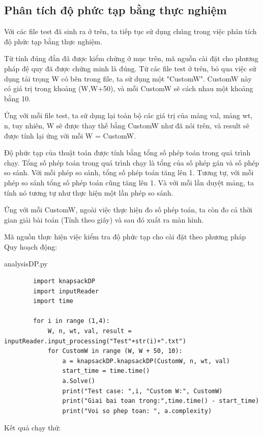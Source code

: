 \documentclass[12pt,a4paper]{report}
\begin{document}
    \subsection{Phân tích độ phức tạp bằng thực nghiệm}
    Với các file test đã sinh ra ở trên, ta tiếp tục sử dụng chúng trong việc phân
    tích độ phức tạp bằng thực nghiệm.

    Từ tính đúng đắn đã được kiểm chứng ở mục trên, mã nguồn cài đặt cho phương 
    pháp đệ quy đã được chứng minh là đúng. Từ các file test ở trên, bỏ qua việc sử 
    dụng tải trọng W có bên trong file, ta sử dụng một "CustomW". CustomW này 
    có giá trị trong khoảng (W,W+50), và mỗi CustomW sẽ cách nhau một khoảng bằng 10. 

    Ứng với mỗi file test, ta sử dụng lại toàn bộ các giá trị của mảng val, mảng wt,
    n, tuy nhiên, W sẽ được thay thế bằng CustomW như đã nói trên, và result sẽ được
    tính lại ứng với mỗi W = CustomW.

    Độ phức tạp của thuật toán được tính bằng tổng số phép toán trong quá trình chạy.
    Tổng số phép toán trong quá trình chạy là tổng của số phép gán và số phép so sánh.
    Với mỗi phép so sánh, tổng số phép toán tăng lên 1. Tương tự, với mỗi phép so sánh
    tổng số phép toán cũng tăng lên 1. Và với mỗi lần duyệt mảng, ta tính nó tương tự 
    như thực hiện một lần phép so sánh.

    Ứng với mỗi CustomW, ngoài việc thực hiện đo số phép toán, ta còn đo cả thời gian 
    giải bài toán (Tính theo giây) và sau đó xuất ra màn hình.

    Mã nguồn thực hiện việc kiểm tra độ phức tạp cho cài đặt theo phương pháp
    Quy hoạch động: 

    analysisDP.py

    \begin{lstlisting}
        import knapsackDP
        import inputReader
        import time

        for i in range (1,4):
            W, n, wt, val, result = inputReader.input_processing("Test"+str(i)+".txt")
            for CustomW in range (W, W + 50, 10):
                a = knapsackDP.knapsackDP(CustomW, n, wt, val)
                start_time = time.time()
                a.Solve()
                print("Test case: ",i, "Custom W:", CustomW)
                print("Giai bai toan trong:",time.time() - start_time)
                print("Voi so phep toan: ", a.complexity)
    \end{lstlisting}

    Kết quả chạy thử:
\end{document}
